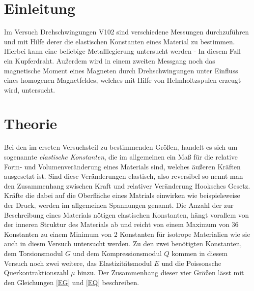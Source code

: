 



  \section{Einleitung}
    Im Versuch Drehschwingungen V102 sind verschiedene Messungen durchzuführen und mit Hilfe 
    derer die elastischen Konstanten eines Material zu bestimmen. Hierbei kann eine beliebige Metalllegierung 
    untersucht werden - In diesem Fall ein Kupferdraht. 
    Außerdem wird in einem zweiten Messgang noch das magnetische Moment eines Magneten durch 
    Drehschwingungen unter Einfluss eines homogenen Magnetfeldes, welches mit Hilfe von Helmholtzspulen erzeugt wird, untersucht.


  
  
  
  
  
    
    
    
    
    
    
  \section{Theorie}
    Bei den im erseten Versuchsteil zu bestimmenden Größen, handelt es sich um sogenannte \emph{elastische Konstanten},
    die im allgemeinen ein Maß für die relative Form- und Volumenveränderung eines Materials sind, welches äußeren Kräften
    ausgesetzt ist. Sind diese Veränderungen elastisch, also reversibel so nennt man den Zusammenhang zwischen Kraft und 
    relativer Veränderung Hooksches Gesetz. 
    Kräfte die dabei auf die Oberfläche eines Matrials einwirken wie beispielsweise der Druck, werden
    im allgemeinen Spannungen genannt. Die Anzahl der zur Beschreibung eines Materials nötigen elastischen Konstanten, 
    hängt vorallem von der inneren Struktur des Materials ab und reicht von einem Maximum von $36$ Konstanten zu einem
    Minimum von $2$ Konstanten für isotrope Materialien wie sie auch in diesm Versuch untersucht werden.
    Zu den zwei benötigten Konstanten, dem Torsionsmodul $G$ und dem Kompressionsmodul $Q$ kommen in diesem Versuch
    noch zwei weitere, das Elastizitätsmodul $E$ und die Poissonsche Querkontraktionszahl $\mu$ hinzu.
    Der Zusammenhang dieser vier Größen lässt mit den Gleichungen \ref{EG} und \ref{EQ} beschreiben.
    
